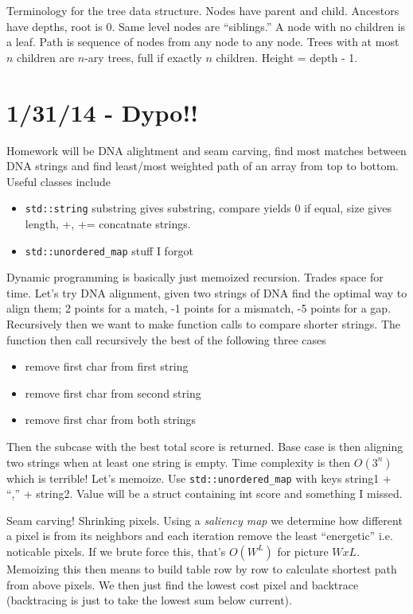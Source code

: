 \documentclass[10pt, twocolumn]{article}
\begin{document}
Terminology for the tree data structure. Nodes have parent and child. Ancestors have depths, root is $0$. Same level nodes are ``siblings.'' A node with no children is a leaf. Path is sequence of nodes from any node to any node. Trees with at most $n$ children are $n$-ary trees, full if exactly $n$ children. Height = depth - 1. 
\section{1/31/14 - Dypo!!}

Homework will be DNA alightment and seam carving, find most matches between DNA strings and find least/most weighted path of an array from top to bottom. Useful classes include
\begin{itemize}
    \item \texttt{std::string} substring gives substring, compare yields $0$ if equal, size gives length, +, += concatnate strings.
    \item \texttt{std::unordered\_map} stuff I forgot
\end{itemize}

Dynamic programming is basically just memoized recursion. Trades space for time. Let's try DNA alignment, given two strings of DNA find the optimal way to align them; 2 points for a match, -1 points for a mismatch, -5 points for a gap. Recursively then we want to make function calls to compare shorter strings. The function then call recursively the best of the following three cases
\begin{itemize}
    \item remove first char from first string
    \item remove first char from second string
    \item remove first char from both strings
\end{itemize}

Then the subcase with the best total score is returned. Base case is then aligning two strings when at least one string is empty. Time complexity is then $O(3^n)$ which is terrible! Let's memoize. Use \texttt{std::unordered\_map} with keys string1 + ``,'' + string2. Value will be a struct containing int score and something I missed.

Seam carving! Shrinking pixels. Using a \emph{saliency map} we determine how different a pixel is from its neighbors and each iteration remove the least ``energetic'' i.e. noticable pixels. If we brute force this, that's $O(W^L)$ for picture $WxL$. Memoizing this then means to build table row by row to calculate shortest path from above pixels. We then just find the lowest cost pixel and backtrace (backtracing is just to take the lowest sum below current).
\end{document}
